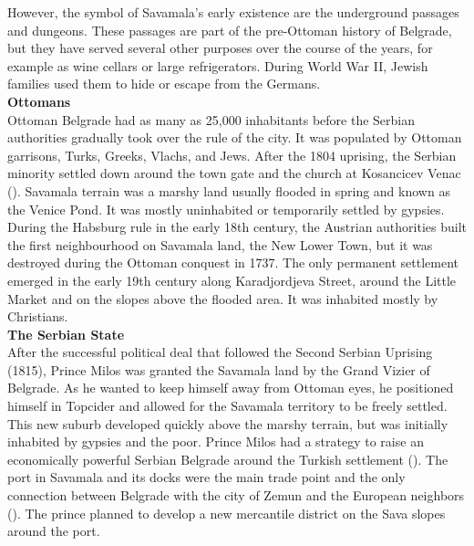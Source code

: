 \documentclass[11pt]{report}
\begin{document}
However, the symbol of Savamala’s early existence are the underground passages and dungeons. These passages are part of the pre-Ottoman history of Belgrade, but they have served several other purposes over the course of the years, for example as wine cellars or large refrigerators. During World War II, Jewish families used them to hide or escape from the Germans.
\\
\textbf{Ottomans}
\\
Ottoman Belgrade had as many as 25,000 inhabitants before the Serbian authorities gradually took over the rule of the city. It was populated by Ottoman garrisons, Turks, Greeks, Vlachs, and Jews. After the 1804 uprising, the Serbian minority settled down around the town gate and the church at Kosancicev Venac (\href{Doytchinov}{\citealt{doytchinov_modernization_2015}}).
Savamala terrain was a marshy land usually flooded in spring and known as the Venice Pond. It was mostly uninhabited or temporarily settled by gypsies. During the Habsburg rule in the early 18th century, the Austrian authorities built the first neighbourhood on Savamala land, the New Lower Town, but it was destroyed during the Ottoman conquest in 1737. The only permanent settlement emerged in the early 19th century along Karadjordjeva Street, around the Little Market and on the slopes above the flooded area. It was inhabited mostly by Christians.
\\
\textbf{The Serbian State}
\\
After the successful political deal that followed the Second Serbian Uprising (1815), Prince Milos was granted the Savamala land by the Grand Vizier of Belgrade. As he wanted to keep himself away from Ottoman eyes, he positioned himself in Topcider and allowed for the Savamala territory to be freely settled. This new suburb developed quickly above the marshy terrain, but was initially inhabited by gypsies and the poor. Prince Milos had a strategy to raise an economically powerful Serbian Belgrade around the Turkish settlement (\href{Krusche}{\citealt{krusche_bureau_2015}}).
The port in Savamala and its docks were the main trade point and the only connection between Belgrade with the city of Zemun and the European neighbors (\href{Doytchinov}{\citealt{doytchinov_modernization_2015}}).
The prince planned to develop a new mercantile district on the Sava slopes around the port. 
\\
\end{document}
